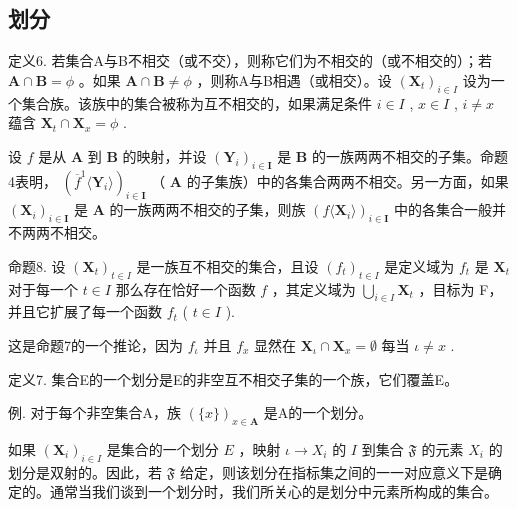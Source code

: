 \subsection{划分}

定义6. 若集合A与B不相交（或不交），则称它们为不相交的（或不相交的）；若 \(\mathbf{A} \cap \mathbf{B} = \phi\) 。如果 \(\mathbf{A} \cap \mathbf{B} \neq \phi\) ，则称A与B相遇（或相交）。设 \((\mathbf{X}_{t})_{i \in I}\) 设为一个集合族。该族中的集合被称为互不相交的，如果满足条件 \(i \in I\) , \(x \in I\) , \(i \neq x\) 蕴含 \(\mathbf{X}_{t} \cap \mathbf{X}_{x} = \phi\) .

设 \(f\) 是从 \(\mathbf{A}\) 到 \(\mathbf{B}\) 的映射，并设 \((\mathbf{Y}_i)_{i\in \mathbf{I}}\) 是 \(\mathbf{B}\) 的一族两两不相交的子集。命题4表明， \((\overline{f}^1\langle \mathbf{Y}_i\rangle)_{i\in \mathbf{I}}\) （ \(\mathbf{A}\) 的子集族）中的各集合两两不相交。另一方面，如果 \((\mathbf{X}_i)_{i\in \mathbf{I}}\) 是 \(\mathbf{A}\) 的一族两两不相交的子集，则族 \((f\langle \mathbf{X}_i\rangle)_{i\in \mathbf{I}}\) 中的各集合一般并不两两不相交。

命题8. 设 \((\mathbf{X}_t)_{t \in I}\) 是一族互不相交的集合，且设 \((f_t)_{t \in I}\) 是定义域为 \(f_t\) 是 \(\mathbf{X}_t\) 对于每一个 \(t \in I\) 那么存在恰好一个函数 \(f\) ，其定义域为 \(\bigcup_{i \in I} \mathbf{X}_t\) ，目标为 F，并且它扩展了每一个函数 \(f_t\) ( \(t \in I\) ).

这是命题7的一个推论，因为 \(f_{\iota}\) 并且 \(f_{x}\) 显然在 \(\mathbf{X}_{\iota} \cap \mathbf{X}_{x} = \emptyset\) 每当 \(\iota \neq x\) .

定义7. 集合E的一个划分是E的非空互不相交子集的一个族，它们覆盖E。

例. 对于每个非空集合A，族 \((\{x\})_{x\in\mathbf{A}}\) 是A的一个划分。

如果 \((\mathbf{X}_i)_{i\in I}\) 是集合的一个划分 \(E\) ，映射 \(\iota \to X_i\) 的 \(I\) 到集合 \(\mathfrak{F}\) 的元素 \(X_i\) 的划分是双射的。因此，若 \(\mathfrak{F}\) 给定，则该划分在指标集之间的一一对应意义下是确定的。通常当我们谈到一个划分时，我们所关心的是划分中元素所构成的集合。

